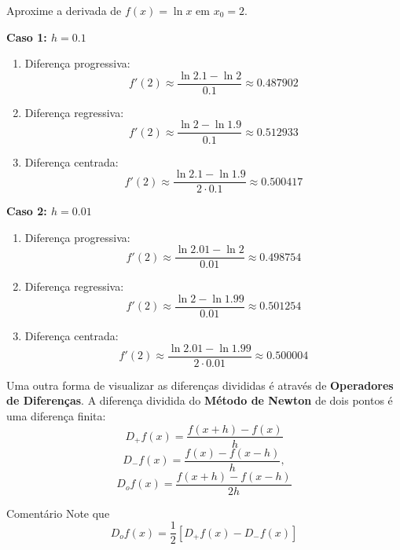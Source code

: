 \documentclass[12pt,openany]{book}
\begin{document}
\begin{example}{}{}

Aproxime a derivada de $f(x) = \ln x$ em $x_0 = 2$.

\textbf{Caso 1: $h = 0.1$}

\begin{enumerate}[label=(\roman*)]
    \item Diferença progressiva:
    \[
        f'(2) \approx \frac{\ln 2.1 - \ln 2}{0.1} \approx 0.487902
    \]

    \item Diferença regressiva:
    \[
        f'(2) \approx \frac{\ln 2 - \ln 1.9}{0.1} \approx 0.512933
    \]

    \item Diferença centrada:
    \[
        f'(2) \approx \frac{\ln 2.1 - \ln 1.9}{2 \cdot 0.1} \approx 0.500417
    \]
\end{enumerate}

\vspace{1em}

\textbf{Caso 2: $h = 0.01$}

\begin{enumerate}[label=(\roman*)]
    \item Diferença progressiva:
    \[
        f'(2) \approx \frac{\ln 2.01 - \ln 2}{0.01} \approx 0.498754
    \]

    \item Diferença regressiva:
    \[
        f'(2) \approx \frac{\ln 2 - \ln 1.99}{0.01} \approx 0.501254
    \]

    \item Diferença centrada:
    \[
        f'(2) \approx \frac{\ln 2.01 - \ln 1.99}{2 \cdot 0.01} \approx 0.500004
    \]
\end{enumerate}

\end{example}

Uma outra forma de visualizar as diferenças divididas é através de \textbf{Operadores de Diferenças}.
A diferença dividida do \textbf{Método de Newton} de dois pontos é uma diferença finita:
\[
    D_+f(x) = \frac{f(x + h) - f(x)}{h}
\]
\[
    D_-f(x) = \frac{f(x) - f(x-h)}{h},
\]
\[
    D_of(x) = \frac{f(x + h) - f(x - h)}{2h}
\]

\begin{remark}{Comentário}{}
    Note que
    \[
        D_of(x) = \frac{1}{2}\left[ D_+f(x) - D_-f(x) \right]
    \]
\end{remark}
\end{document}
